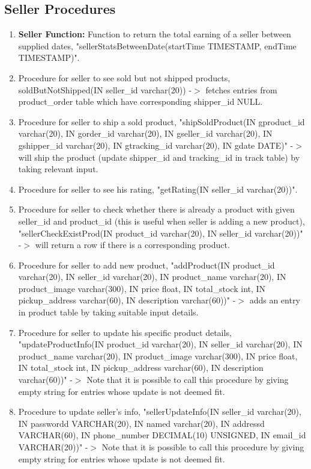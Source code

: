 \documentclass[a4paper,12pt]{article}
\begin{document}
\subsection{Seller Procedures}
\begin{enumerate}
  \item \textbf{Seller Function: }Function to return the total earning of a seller between supplied dates, "sellerStatsBetweenDate(startTime TIMESTAMP, endTime TIMESTAMP)".
  \item Procedure for seller to see sold but not shipped products, soldButNotShipped(IN seller\_id varchar(20)) -$>$ fetches entries from product\_order table which have corresponding shipper\_id NULL.
  \item Procedure for seller to ship a sold product, "shipSoldProduct(IN gproduct\_id varchar(20), IN gorder\_id varchar(20), IN gseller\_id varchar(20), IN gshipper\_id varchar(20), IN gtracking\_id varchar(20), IN gdate DATE)" -$>$ will ship the product (update shipper\_id and tracking\_id in track table) by taking relevant input.
  \item Procedure for seller to see his rating, "getRating(IN seller\_id varchar(20))".
  \item Procedure for seller to check whether there is already a product with given seller\_id and product\_id (this is useful when seller is adding a new product), "sellerCheckExistProd(IN product\_id varchar(20), IN seller\_id varchar(20))" -$>$ will return a row if there is a corresponding product.
  \item Procedure for seller to add new product, "addProduct(IN product\_id varchar(20), IN seller\_id varchar(20), IN product\_name varchar(20), IN product\_image varchar(300), IN price float, IN total\_stock int, IN pickup\_address varchar(60), IN description varchar(60))" -$>$ adds an entry in product table by taking suitable input details.
  \item Procedure for seller to update his specific product details, "updateProductInfo(IN product\_id varchar(20), IN seller\_id varchar(20), IN product\_name varchar(20), IN product\_image varchar(300), IN price float, IN total\_stock int, IN pickup\_address varchar(60), IN description varchar(60))" -$>$ Note that it is possible to call this procedure by giving empty string for entries whose update is not deemed fit.
  \item Procedure to update seller's info, "sellerUpdateInfo(IN seller\_id varchar(20), IN passwordd VARCHAR(20), IN named varchar(20), IN addressd VARCHAR(60), IN phone\_number DECIMAL(10) UNSIGNED, IN email\_id VARCHAR(20))" -$>$ Note that it is possible to call this procedure by giving empty string for entries whose update is not deemed fit.

\end{enumerate}
\end{document}
